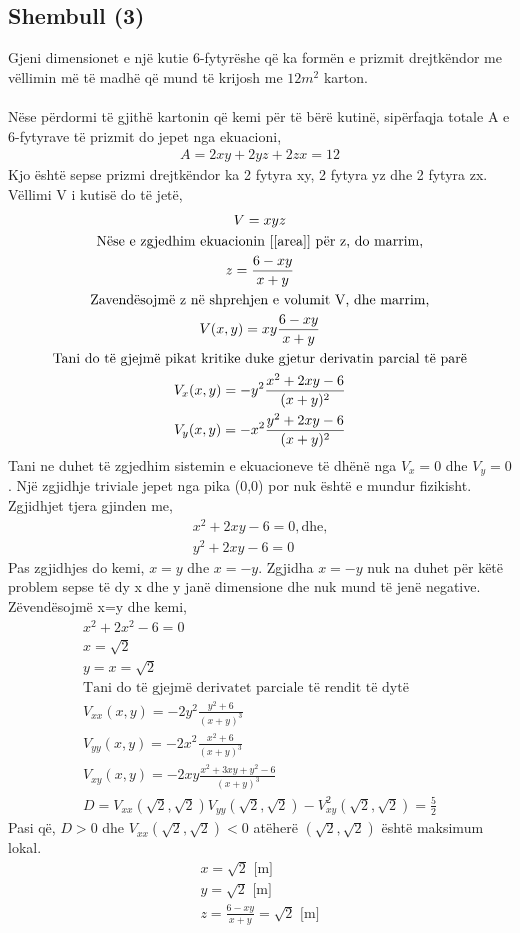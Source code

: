 \documentclass[a4paper]{article}
\begin{document}
\subsection{Shembull (3)}
Gjeni dimensionet e një kutie 6-fytyrëshe që ka formën e prizmit drejtkëndor me vëllimin më të madhë që mund të krijosh me $12m^2$ karton.
\\\\
Nëse përdormi të gjithë kartonin që kemi për të bërë kutinë, sipërfaqja totale A e 6-fytyrave të prizmit do jepet nga ekuacioni,
\begin{gather}
	\label{area}
	A=2xy+2yz+2zx=12
\end{gather}
Kjo është sepse prizmi drejtkëndor ka 2 fytyra xy, 2 fytyra yz dhe 2 fytyra zx. Vëllimi V i kutisë do të jetë,
\begin{gather*}
	V = xyz\\
	\text{Nëse e zgjedhim ekuacionin [\ref{area}] për z, do marrim,}\\
	z = \frac{6-xy}{x+y}\\
	\text{Zavendësojmë z në shprehjen e volumit V, dhe marrim,}\\
	V(x,y) = xy\frac{6-xy}{x+y}\\
	\text{Tani do të gjejmë pikat kritike duke gjetur derivatin parcial të parë}\\
	V_x(x,y)=-y^2\frac{x^2+2xy-6}{(x+y)^2}\\
	V_y(x,y)=-x^2\frac{y^2+2xy-6}{(x+y)^2}\end{gather*}
Tani ne duhet të zgjedhim sistemin e ekuacioneve të dhënë nga $V_x=0$ dhe $V_y=0$. Një zgjidhje triviale jepet nga pika (0,0) por nuk është e mundur fizikisht. Zgjidhjet tjera gjinden me,
\begin{gather*}
	x^2+2xy-6=0, \text{dhe,}\\
	y^2+2xy-6=0
\end{gather*}
Pas zgjidhjes do kemi,
$x=y$ dhe $x=-y$.
Zgjidha $x=-y$ nuk na duhet për këtë problem sepse të dy x dhe y janë dimensione dhe nuk mund të jenë negative. Zëvendësojmë x=y dhe kemi,
\begin{gather*}
	x^2+2x^2-6=0\\
	x=\sqrt{2}\\
	y=x=\sqrt{2} \\
	\text{Tani do të gjejmë derivatet parciale të rendit të dytë}\\
	V_{x x}(x,y) = -2y^2\frac{y^2+6}{(x+y)^3}\\
	V_{y y}(x,y) = -2x^2\frac{x^2+6}{(x+y)^3}\\
	V_{x y}(x,y) = -2xy\frac{x^2+3xy+y^2-6}{(x+y)^3}\\
	D=V_{x x}(\sqrt{2},\sqrt{2})V_{y y}(\sqrt{2},\sqrt{2})-V_{x y}^2(\sqrt{2},\sqrt{2}) = \frac{5}{2}
\end{gather*}
Pasi që, $D > 0$ dhe $V_{x x}(\sqrt{2},\sqrt{2}) < 0$ atëherë $\left( \sqrt{2},\sqrt{2}\right)$ është maksimum lokal.
\begin{gather*}
	x=\sqrt{2} \text{ [m]}\\
	y=\sqrt{2} \text{ [m]}\\
	z=\frac{6-xy}{x+y} = \sqrt{2} \text{ [m]}
\end{gather*}
\newpage
\end{document}
